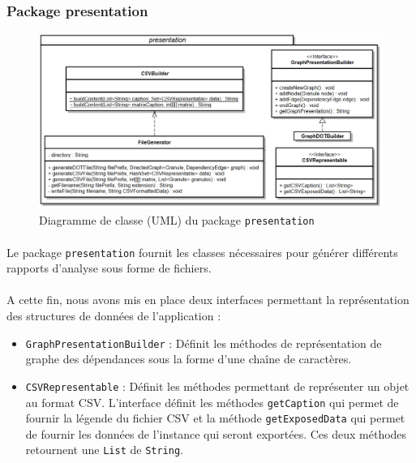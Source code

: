 \documentclass{scrartcl}
\begin{document}
\subsubsection{Package presentation}
    \begin{figure}[h!]
        \centering
        \includegraphics[width=\textwidth]{img/uml/presentation.png}
        \caption{Diagramme de classe (UML) du package \texttt{presentation}}
    \end{figure}

    \paragraph{}Le package \texttt{presentation} fournit les classes nécessaires pour générer différents rapports d'analyse sous forme de fichiers. 
    
    \paragraph{}A cette fin, nous avons mis en place deux interfaces permettant la représentation des structures de données de l'application :
    \begin{itemize}
        \item \texttt{GraphPresentationBuilder} : Définit les méthodes de représentation de graphe des dépendances sous la forme d'une chaîne de caractères.
        \item \texttt{CSVRepresentable} : Définit les méthodes permettant de représenter un objet au format CSV. L'interface définit les méthodes \texttt{getCaption} qui permet de fournir la légende du fichier CSV et la méthode \texttt{getExposedData} qui permet de fournir les données de l'instance qui seront exportées. Ces deux méthodes retournent une \texttt{List} de \texttt{String}.
    \end{itemize}
    
\end{document}
